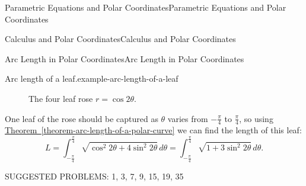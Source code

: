 \documentclass[10pt,]{book}
\numberwithin{equation}{section}
\begin{document}
\begin{chapterptx}{Parametric Equations and Polar Coordinates}{}{Parametric Equations and Polar Coordinates}{}{}
\begin{sectionptx}{Calculus and Polar Coordinates}{}{Calculus and Polar Coordinates}{}{}
\begin{subsectionptx}{Arc Length in Polar Coordinates}{}{Arc Length in Polar Coordinates}{}{}
\begin{example}{Arc length of a leaf.}{example-arc-length-of-a-leaf}
\begin{figure}
\centering
{
}
\caption{The four leaf rose \(r=\cos2\theta\).\label{figure-rose}}
\end{figure}
\hypertarget{p-842}{}%
One leaf of the rose should be captured as \(\theta\) varies from \(-\frac{\pi}{4}\) to \(\frac{\pi}{4}\), so using \hyperref[theorem-arc-length-of-a-polar-curve]{Theorem~\ref{theorem-arc-length-of-a-polar-curve}} we can find the length of this leaf:%
%
\begin{equation*}
L = \int_{-\frac{\pi}{4}}^{\frac{\pi}{4}}\sqrt{\cos^{2}2\theta + 4\sin^{2}2\theta}\,d\theta = \int_{-\frac{\pi}{4}}^{\frac{\pi}{4}}\sqrt{1 + 3\sin^{2}2\theta}\,d\theta.
\end{equation*}
\end{example}
\hypertarget{p-843}{}%
SUGGESTED PROBLEMS: 1, 3, 7, 9, 15, 19, 35%
\end{subsectionptx}
\end{sectionptx}
\end{chapterptx}
%
%
\typeout{************************************************}
\typeout{************************************************}
%
\end{document}
